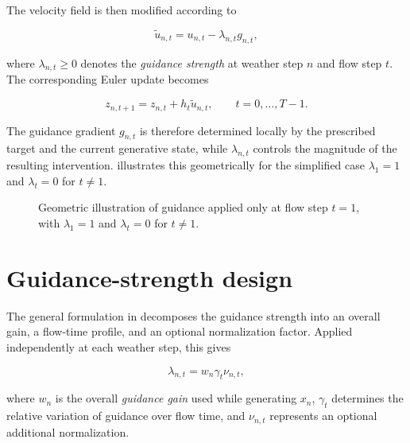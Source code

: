The velocity field is then modified according to

\begin{equation}
    \tilde{u}_{n,t}
    =
    u_{n,t}
    -
    \lambda_{n,t} g_{n,t},
    \label{eq:target-driven-guided-velocity}
\end{equation}

where $\lambda_{n,t}\geq0$ denotes the \emph{guidance strength} at weather
step $n$ and flow step $t$. The corresponding Euler update becomes

\begin{equation}
    z_{n,t+1}
    =
    z_{n,t}
    +
    h_t
    \tilde{u}_{n,t},
    \qquad
    t=0,\ldots,T-1.
    \label{eq:guided-euler-update}
\end{equation}

The guidance gradient $g_{n,t}$ is therefore determined locally by the
prescribed target and the current generative state, while
$\lambda_{n,t}$ controls the magnitude of the resulting intervention.
 illustrates this geometrically for the
simplified case $\lambda_1=1$ and $\lambda_t=0$ for $t\neq1$.

\begin{figure}[t]
    \centering
    
    \caption{
        Geometric illustration of guidance applied only at flow step $t=1$,
        with $\lambda_1=1$ and $\lambda_t=0$ for $t\neq1$.
    }
    \label{fig:guided-flow-geometry}
\end{figure}


\section{Guidance-strength design}
\label{sec:guidance-strength-design}

The general formulation in  decomposes
the guidance strength into an overall gain, a flow-time profile, and an
optional normalization factor. Applied independently at each weather step,
this gives

\begin{equation}
    \lambda_{n,t}
    =
    w_n \gamma_t \nu_{n,t},
    \label{eq:guidance-strength-decomposition}
\end{equation}

where $w_n$ is the overall \emph{guidance gain} used while generating $x_n$,
$\gamma_t$ determines the relative variation of guidance over flow time, and
$\nu_{n,t}$ represents an optional additional normalization.

